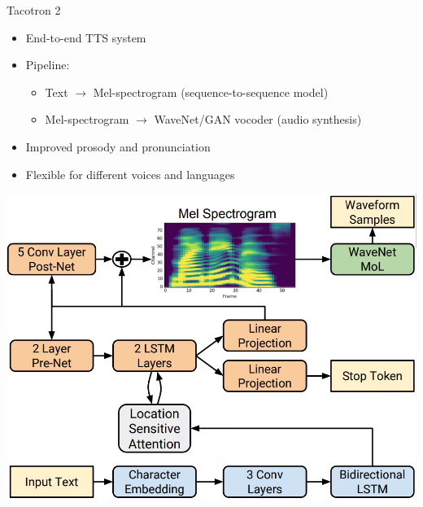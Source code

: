 \begin{frame}[allowframebreaks]{Tacotron 2}
    \begin{itemize}
        \item End-to-end TTS system
        \item Pipeline:
        \begin{itemize}
            \item Text $\rightarrow$ Mel-spectrogram (sequence-to-sequence model)
            \item Mel-spectrogram $\rightarrow$ WaveNet/GAN vocoder (audio synthesis)
        \end{itemize}
        \item Improved prosody and pronunciation
        \item Flexible for different voices and languages
    \end{itemize}
    \begin{center}
        \includegraphics[width=\textwidth,height=0.9\textheight,keepaspectratio]{images/audio-nlp/tacotron2_pipeline.png}
    \end{center}
\end{frame}

